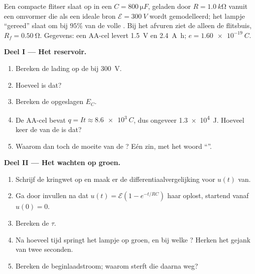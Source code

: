 \begin{problem}
\label{pb:g12:rc-rl-circuits:1}
Een compacte flitser slaat  op in een 
$C = \qty{800}{\micro F}$, geladen door $R = \qty{1.0}{k\ohm}$ vanuit een
omvormer die als een ideale bron $\mathcal{E} = \qty{300}{V}$ wordt
gemodelleerd; het lampje ``gereed'' slaat om bij $95\%$ van de volle .
Bij het afvuren ziet de  alleen de flitsbuis,
$R_f = \qty{0.50}{\ohm}$. Gegevens: een AA-cel levert \qty{1.5}{V} en
\qty{2.4}{A.h}; $e = \qty{1.60e-19}{C}$.

\medskip
\noindent\textbf{Deel I --- Het reservoir.}
\begin{enumerate}
  \item Bereken de lading op de  bij \qty{300}{V}.
  \item Hoeveel  is dat?
  \item Bereken de opgeslagen  $E_C$.
  \item De AA-cel bevat $q = It \approx \qty{8.6e3}{C}$, dus ongeveer
        \qty{1.3e4}{J}. Hoeveel keer de  van de  is dat?
  \item Waarom dan toch de moeite van de ? Eén zin, met het woord
        ``''.
\end{enumerate}

\medskip
\noindent\textbf{Deel II --- Het wachten op groen.}
\begin{enumerate}[resume]
  \item Schrijf de kringwet op en maak er de differentiaalvergelijking voor
        $u(t)$ van.
  \item Ga door invullen na dat $u(t) = \mathcal{E}(1 - e^{-t/RC})$ haar
        oplost, startend vanaf $u(0) = 0$.
  \item Bereken de  $\tau$.
  \item Na hoeveel tijd springt het lampje op groen, en bij welke ?
        Herken het gejank van twee seconden.
  \item Bereken de beginlaadstroom; waarom sterft die daarna weg?
\end{enumerate}


\end{problem}
